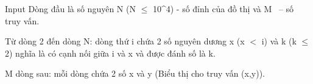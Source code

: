 Input
Dòng đầu là số nguyên N (N  $\le$  10^4) - số đỉnh của đồ thị và M  – số truy vấn.

Từ dòng 2 đến dòng N: dòng thứ i chứa 2 số nguyên dương x (x $<$ i) và k (k  $\le$  2) nghĩa là có cạnh nối giữa i và x và được đánh số là k.

M dòng sau: mỗi dòng chứa 2 số x và y (Biểu thị cho truy vấn (x,y)).